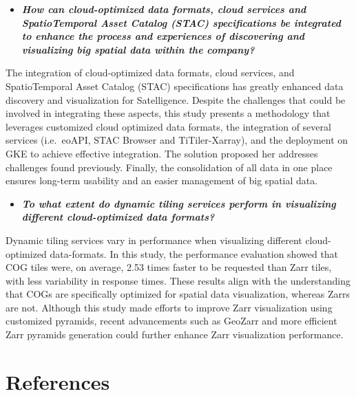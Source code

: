 \documentclass[
  oneside,
  open=any]{scrbook}
\providecommand{\tightlist}{%
  \setlength{\itemsep}{0pt}\setlength{\parskip}{0pt}}\usepackage{longtable,booktabs,array}
\begin{document}
\begin{itemize}
\tightlist
\item
  \textbf{\emph{How can cloud-optimized data formats, cloud services and
  SpatioTemporal Asset Catalog (STAC) specifications be integrated to
  enhance the process and experiences of discovering and visualizing big
  spatial data within the company?}}
\end{itemize}

The integration of cloud-optimized data formats, cloud services, and
SpatioTemporal Asset Catalog (STAC) specifications has greatly enhanced
data discovery and visualization for Satelligence. Despite the
challenges that could be involved in integrating these aspects, this
study presents a methodology that leverages customized cloud optimized
data formats, the integration of several services (i.e.~eoAPI, STAC
Browser and TiTiler-Xarray), and the deployment on GKE to achieve
effective integration. The solution proposed her addresses challenges
found previously. Finally, the consolidation of all data in one place
ensures long-term usability and an easier management of big spatial
data.

\begin{itemize}
\tightlist
\item
  \textbf{\emph{To what extent do dynamic tiling services perform in
  visualizing different cloud-optimized data formats?}}
\end{itemize}

Dynamic tiling services vary in performance when visualizing different
cloud-optimized data-formats. In this study, the performance evaluation
showed that COG tiles were, on average, 2.53 times faster to be
requested than Zarr tiles, with less variability in response times.
These results align with the understanding that COGs are specifically
optimized for spatial data visualization, whereas Zarrs are not.
Although this study made efforts to improve Zarr visualization using
customized pyramids, recent advancements such as GeoZarr and more
efficient Zarr pyramids generation could further enhance Zarr
visualization performance.

\chapter*{References}\label{references}
\end{document}
